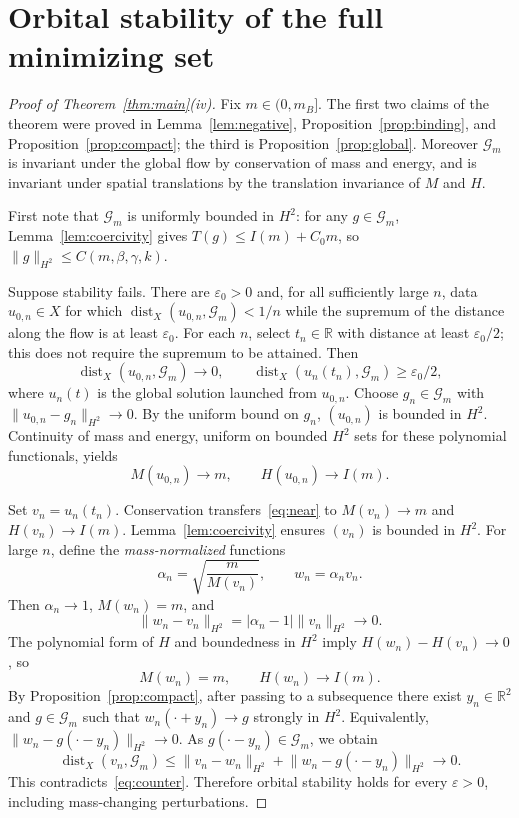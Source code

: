 \documentclass[11pt]{article}
\DeclareMathOperator{\dist}{dist}
\newcommand{\RR}{\mathbb R}
\newcommand{\nm}[2]{\lVert #1\rVert_{#2}}
\newcommand{\GG}{\mathcal G}
\begin{document}
\section{Orbital stability of the full minimizing set}
\begin{proof}[Proof of Theorem~\ref{thm:main}(iv)]
Fix \(m\in(0,m_B]\). The first two claims of the theorem were proved
in Lemma~\ref{lem:negative}, Proposition~\ref{prop:binding}, and
Proposition~\ref{prop:compact}; the third is Proposition~\ref{prop:global}.
Moreover \(\GG_m\) is invariant under the global flow by conservation of
mass and energy, and is invariant under spatial translations by the
translation invariance of \(M\) and \(H\).

First note that \(\GG_m\) is uniformly bounded in \(H^2\): for any
\(g\in\GG_m\), Lemma~\ref{lem:coercivity} gives
\(T(g)\le I(m)+C_0m\), so
\(\nm{g}{H^2}\le C(m,\beta,\gamma,k)\).

Suppose stability fails. There are \(\varepsilon_0>0\) and, for
all sufficiently large \(n\), data \(u_{0,n}\in X\) for which
\(\dist_X(u_{0,n},\GG_m)<1/n\) while the supremum of the
distance along the flow is at least \(\varepsilon_0\).
For each \(n\), select \(t_n\in\RR\) with distance at least
\(\varepsilon_0/2\); this does not require the supremum to be attained. Then
\begin{equation}\label{eq:counter}
\dist_X(u_{0,n},\GG_m)\to0,\qquad
\dist_X(u_n(t_n),\GG_m)\ge\varepsilon_0/2,
\end{equation}
where \(u_n(t)\) is the global solution launched from \(u_{0,n}\).
Choose \(g_n\in\GG_m\) with
\(\nm{u_{0,n}-g_n}{H^2}\to0\). By the uniform bound on \(g_n\),
\((u_{0,n})\) is bounded in \(H^2\). Continuity of mass and energy,
uniform on bounded \(H^2\) sets for these polynomial functionals, yields
\begin{equation}\label{eq:near}
M(u_{0,n})\to m,\qquad H(u_{0,n})\to I(m).
\end{equation}

Set \(v_n=u_n(t_n)\). Conservation transfers~\eqref{eq:near} to
\(M(v_n)\to m\) and \(H(v_n)\to I(m)\).
Lemma~\ref{lem:coercivity} ensures \((v_n)\) is bounded in \(H^2\).
For large \(n\), define the \emph{mass-normalized} functions
\[
\alpha_n=\sqrt{\frac{m}{M(v_n)}},\qquad
w_n=\alpha_n v_n.
\]
Then \(\alpha_n\to1\), \(M(w_n)=m\), and
\[
\nm{w_n-v_n}{H^2}
=|\alpha_n-1|\nm{v_n}{H^2}\to0.
\]
The polynomial form of \(H\) and boundedness in \(H^2\) imply
\(H(w_n)-H(v_n)\to0\), so
\[
M(w_n)=m,\qquad H(w_n)\to I(m).
\]
By Proposition~\ref{prop:compact}, after passing to a subsequence there
exist \(y_n\in\RR^2\) and \(g\in\GG_m\) such that
\(w_n(\cdot+y_n)\to g\) strongly in \(H^2\).
Equivalently, \(\nm{w_n-g(\cdot-y_n)}{H^2}\to0\).
As \(g(\cdot-y_n)\in\GG_m\), we obtain
\[
\dist_X(v_n,\GG_m)\le
\nm{v_n-w_n}{H^2}
+\nm{w_n-g(\cdot-y_n)}{H^2}\longrightarrow0.
\]
This contradicts~\eqref{eq:counter}. Therefore orbital stability holds
for every \(\varepsilon>0\), including mass-changing perturbations.
\end{proof}
\end{document}
